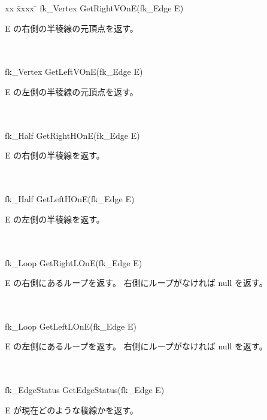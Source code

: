 \begin{tabbing}
xx \= xxxx \= \kill
 \> fk\_Vertex GetRightVOnE(fk\_Edge E) \\
	\> \> \begin{minipage}[]{15cm}
		E の右側の半稜線の元頂点を返す。
	\end{minipage} \\ \\

 \> fk\_Vertex GetLeftVOnE(fk\_Edge E) \\
	\> \> \begin{minipage}[]{15cm}
		E の左側の半稜線の元頂点を返す。
	\end{minipage} \\ \\

 \> fk\_Half GetRightHOnE(fk\_Edge E) \\
	\> \> \begin{minipage}[]{15cm}
		E の右側の半稜線を返す。
	\end{minipage} \\ \\

 \> fk\_Half GetLeftHOnE(fk\_Edge E) \\
	\> \> \begin{minipage}[]{15cm}
		E の左側の半稜線を返す。
	\end{minipage} \\ \\

 \> fk\_Loop GetRightLOnE(fk\_Edge E) \\
	\> \> \begin{minipage}[]{15cm}
		E の右側にあるループを返す。
		右側にループがなければ null を返す。
	\end{minipage} \\ \\

 \> fk\_Loop GetLeftLOnE(fk\_Edge E) \\
	\> \> \begin{minipage}[]{15cm}
		E の左側にあるループを返す。
		右側にループがなければ null を返す。
	\end{minipage} \\ \\

 \> fk\_EdgeStatus GetEdgeStatus(fk\_Edge E) \\
	\> \> \begin{minipage}[]{15cm}
		E が現在どのような稜線かを返す。
	\end{minipage}
\end{tabbing}
